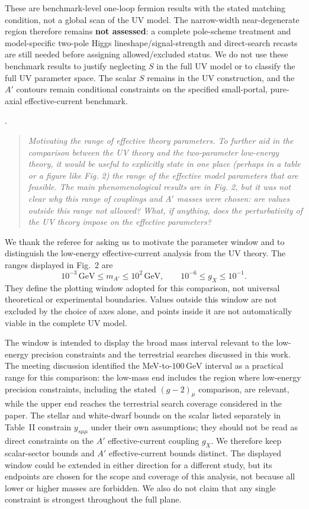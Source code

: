 \documentclass[12pt,a4paper]{article}
\begin{document}
These are benchmark-level one-loop fermion results with the stated matching condition, not a global scan of the UV model. The narrow-width near-degenerate region therefore remains \textbf{not assessed}: a complete pole-scheme treatment and model-specific two-pole Higgs lineshape/signal-strength and direct-search recasts are still needed before assigning allowed/excluded status. We do not use these benchmark results to justify neglecting \(S\) in the full UV model or to classify the full UV parameter space. The scalar \(S\) remains in the UV construction, and the \(A'\) contours remain conditional constraints on the specified small-portal, pure-axial effective-current benchmark.

\medskip
{}. \begin{quote}\itshape
Motivating the range of effective theory parameters. To further aid in the comparison between the UV theory and the two-parameter low-energy theory, it would be useful to explicitly state in one place (perhaps in a table or a figure like Fig. 2) the range of the effective model parameters that are feasible. The main phenomenological results are in Fig. 2, but it was not clear why this range of couplings and \(A'\) masses were chosen: are values outside this range not allowed? What, if anything, does the perturbativity of the UV theory impose on the effective parameters?\end{quote}

We thank the referee for asking us to motivate the parameter window and to distinguish the low-energy effective-current analysis from the UV theory. The ranges displayed in Fig.~2 are
\[
10^{-3}\,\mathrm{GeV}\leq m_{A'}\leq10^2\,\mathrm{GeV},
\qquad
10^{-6}\leq g_X\leq10^{-1}.
\]
They define the plotting window adopted for this comparison, not universal theoretical or experimental boundaries. Values outside this window are not excluded by the choice of axes alone, and points inside it are not automatically viable in the complete UV model.

The window is intended to display the broad mass interval relevant to the low-energy precision constraints and the terrestrial searches discussed in this work. The meeting discussion identified the MeV-to-\(100\,\mathrm{GeV}\) interval as a practical range for this comparison: the low-mass end includes the region where low-energy precision constraints, including the stated \((g-2)_\mu\) comparison, are relevant, while the upper end reaches the terrestrial search coverage considered in the paper. The stellar and white-dwarf bounds on the scalar listed separately in Table~II constrain \(y_{s\mu\mu}\) under their own assumptions; they should not be read as direct constraints on the \(A'\) effective-current coupling \(g_X\). We therefore keep scalar-sector bounds and \(A'\) effective-current bounds distinct. The displayed window could be extended in either direction for a different study, but its endpoints are chosen for the scope and coverage of this analysis, not because all lower or higher masses are forbidden. We also do not claim that any single constraint is strongest throughout the full plane.
\end{document}
